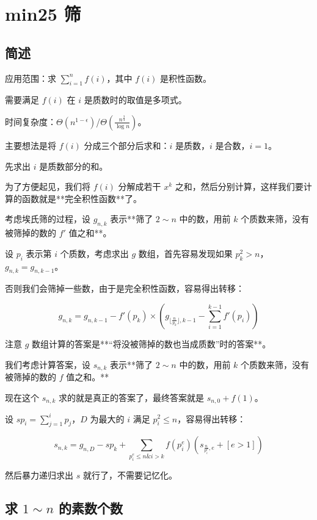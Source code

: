 \section{min25 筛}

\subsection{简述}

应用范围：求 $\sum_{i=1}^n f(i)$，其中 $f(i)$ 是积性函数。

需要满足 $f(i)$ 在 $i$ 是质数时的取值是多项式。

时间复杂度：$\Theta(n^{1-\epsilon})$/$\Theta(\frac{n^{\frac{3}{4}}}{\log n})$。

主要想法是将 $f(i)$ 分成三个部分后求和：$i$ 是质数，$i$ 是合数，$i=1$。

先求出 $i$ 是质数部分的和。

为了方便起见，我们将 $f(i)$ 分解成若干 $x^k$ 之和，然后分别计算，这样我们要计算的函数就是**完全积性函数**了。

考虑埃氏筛的过程，设 $g_{n,k}$ 表示**筛了 $2 \sim n$ 中的数，用前 $k$ 个质数来筛，没有被筛掉的数的 $f'$ 值之和**。

设 $p_i$ 表示第 $i$ 个质数，考虑求出 $g$ 数组，首先容易发现如果 $p_k^2 > n$，$g_{n,k}=g_{n,k-1}$。

否则我们会筛掉一些数，由于是完全积性函数，容易得出转移：

$$g_{n,k}=g_{n,k-1}-f'(p_k) \times (g_{\lfloor \frac{n}{p_k} \rfloor,k-1}-\sum_{i=1}^{k-1}f'(p_i))$$

注意 $g$ 数组计算的答案是**“将没被筛掉的数也当成质数”时的答案**。

我们考虑计算答案，设 $s_{n,k}$ 表示**筛了 $2 \sim n$ 中的数，用前 $k$ 个质数来筛，没有被筛掉的数的 $f$ 值之和。**

现在这个 $s_{n,k}$ 求的就是真正的答案了，最终答案就是 $s_{n,0}+f(1)$。

设 $sp_i=\sum_{j=1}^i p_j$，$D$ 为最大的 $i$ 满足 $p_i^2 \le n$，容易得出转移：

$$s_{n,k}=g_{n,D}-sp_{k}+\sum_{p_i^e \le n \& i>k} f({p_i^e})(s_{\frac{n}{p_i^e},e}+[e>1])$$

然后暴力递归求出 $s$ 就行了，不需要记忆化。

\subsection{求 $1 \sim n$ 的素数个数}

